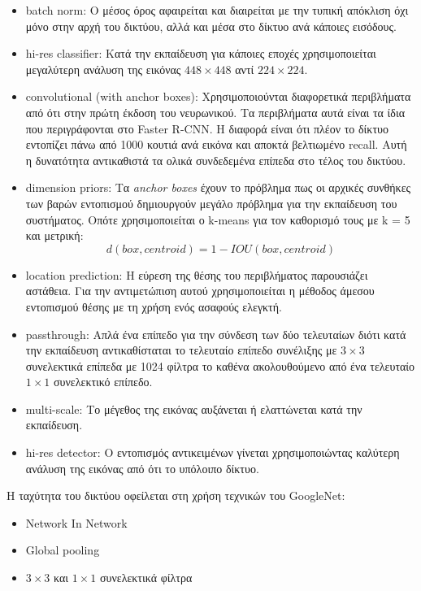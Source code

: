 \begin{itemize}
\setlength\itemsep{0em}

\item[] batch norm: Ο μέσος όρος αφαιρείται και διαιρείται με την τυπική απόκλιση όχι μόνο στην αρχή του δικτύου, αλλά και μέσα στο δίκτυο ανά κάποιες εισόδους.

\item[] hi-res classifier: Κατά την εκπαίδευση για κάποιες εποχές χρησιμοποιείται μεγαλύτερη ανάλυση της εικόνας $448\times448$ αντί $224\times224$.

\item[] convolutional (with anchor boxes): Χρησιμοποιούνται διαφορετικά περιβλήματα από ότι στην πρώτη έκδοση του νευρωνικού. Τα περιβλήματα αυτά είναι τα ίδια που περιγράφονται στο Faster R-CNN. Η διαφορά είναι ότι πλέον το δίκτυο εντοπίζει πάνω από 1000 κουτιά ανά εικόνα και αποκτά βελτιωμένο recall. Αυτή η δυνατότητα αντικαθιστά τα ολικά συνδεδεμένα επίπεδα στο τέλος του δικτύου.

\item[] dimension priors: Τα \textit{anchor boxes} έχουν το πρόβλημα πως οι αρχικές συνθήκες των βαρών εντοπισμού δημιουργούν μεγάλο πρόβλημα για την εκπαίδευση του συστήματος. Οπότε χρησιμοποιείται ο k-means για τον καθορισμό τους με k = 5 και μετρική:
$$ d(box,centroid) = 1 - IOU(box, centroid) $$

\item[] location prediction: Η εύρεση της θέσης του περιβλήματος παρουσιάζει αστάθεια. Για την αντιμετώπιση αυτού χρησιμοποιείται η μέθοδος άμεσου εντοπισμού θέσης με τη χρήση ενός ασαφούς ελεγκτή.

\item[] passthrough: Απλά ένα επίπεδο για την σύνδεση των δύο τελευταίων διότι κατά την εκπαίδευση αντικαθίσταται το τελευταίο επίπεδο συνέλιξης με $3 \times 3$ συνελεκτικά επίπεδα με 1024 φίλτρα το καθένα ακολουθούμενο από ένα τελευταίο $1 \times 1$ συνελεκτικό επίπεδο.

\item[] multi-scale: Το μέγεθος της εικόνας αυξάνεται ή ελαττώνεται κατά την εκπαίδευση.

\item[] hi-res detector: Ο εντοπισμός αντικειμένων γίνεται χρησιμοποιώντας καλύτερη ανάλυση της εικόνας από ότι το υπόλοιπο δίκτυο.

\end{itemize}


Η ταχύτητα του δικτύου οφείλεται στη χρήση τεχνικών του GoogleNet\cite{17}:
\begin{itemize}
  \setlength\itemsep{0em}
  \item Network In Network
  \item Global pooling
  \item $3\times3$ και $1\times1$ συνελεκτικά φίλτρα
\end{itemize}


